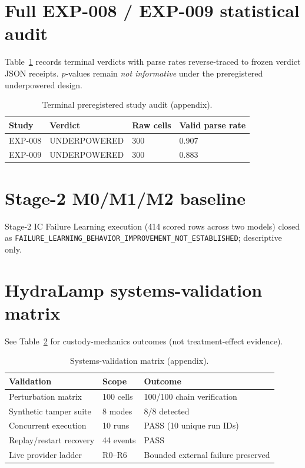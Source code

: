 \section{Full EXP-008 / EXP-009 statistical audit}
\label{app:exp-stats}
Table~\ref{tab:app_exp_stats} records terminal verdicts with parse rates reverse-traced to frozen verdict JSON receipts. $p$-values remain \emph{not informative} under the preregistered underpowered design.

\begin{table}[h]
  \centering
  \caption{Terminal preregistered study audit (appendix).}
  \label{tab:app_exp_stats}
  \begin{tabular}{llll}
    \toprule
    Study & Verdict & Raw cells & Valid parse rate \\
    \midrule
    EXP-008 & UNDERPOWERED & 300 & 0.907 \\
    EXP-009 & UNDERPOWERED & 300 & 0.883 \\
    \bottomrule
  \end{tabular}
\end{table}

\section{Stage-2 M0/M1/M2 baseline}
\label{app:stage2}
Stage-2 IC Failure Learning execution (414 scored rows across two models) closed as \texttt{FAILURE\_LEARNING\_BEHAVIOR\_IMPROVEMENT\_NOT\_ESTABLISHED}; descriptive only.

\section{HydraLamp systems-validation matrix}
\label{app:systems}
See Table~\ref{tab:app_systems} for custody-mechanics outcomes (not treatment-effect evidence).

\begin{table}[h]
  \centering
  \caption{Systems-validation matrix (appendix).}
  \label{tab:app_systems}
  \begin{tabular}{lll}
    \toprule
    Validation & Scope & Outcome \\
    \midrule
    Perturbation matrix & 100 cells & 100/100 chain verification \\
    Synthetic tamper suite & 8 modes & 8/8 detected \\
    Concurrent execution & 10 runs & PASS (10 unique run IDs) \\
    Replay/restart recovery & 44 events & PASS \\
    Live provider ladder & R0--R6 & Bounded external failure preserved \\
    \bottomrule
  \end{tabular}
\end{table}

